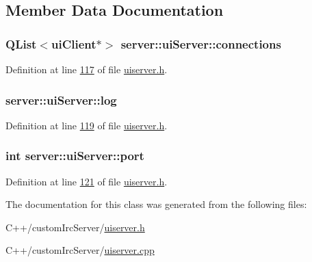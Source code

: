 \subsection{Member Data Documentation}
\hypertarget{classserver_1_1ui_server_a8e2c0099cfa061c41eb45bb050f55321}{
\subsubsection[{connections}]{\setlength{\rightskip}{0pt plus 5cm}Q\-List$<${\bf ui\-Client}$\ast$$>$ server\-::ui\-Server\-::connections\hspace{0.3cm}{\ttfamily [private]}}}\label{df/dd2/classserver_1_1ui_server_a8e2c0099cfa061c41eb45bb050f55321}


Definition at line \hyperlink{uiserver_8h_source_l00117}{117} of file \hyperlink{uiserver_8h_source}{uiserver.\-h}.

\hypertarget{classserver_1_1ui_server_a0c287bc3691a6aabe181158cf1176632}{
\subsubsection[{log}]{ server\-::ui\-Server\-::log\hspace{0.3cm}{\ttfamily [private]}}}\label{df/dd2/classserver_1_1ui_server_a0c287bc3691a6aabe181158cf1176632}


Definition at line \hyperlink{uiserver_8h_source_l00119}{119} of file \hyperlink{uiserver_8h_source}{uiserver.\-h}.

\hypertarget{classserver_1_1ui_server_a960211cb9716f5d3b403d10ccface8b8}{
\subsubsection[{port}]{\setlength{\rightskip}{0pt plus 5cm}int server\-::ui\-Server\-::port\hspace{0.3cm}{\ttfamily [private]}}}\label{df/dd2/classserver_1_1ui_server_a960211cb9716f5d3b403d10ccface8b8}


Definition at line \hyperlink{uiserver_8h_source_l00121}{121} of file \hyperlink{uiserver_8h_source}{uiserver.\-h}.



The documentation for this class was generated from the following files\-:\begin{DoxyCompactItemize}
\item 
C++/custom\-Irc\-Server/\hyperlink{uiserver_8h}{uiserver.\-h}\item 
C++/custom\-Irc\-Server/\hyperlink{uiserver_8cpp}{uiserver.\-cpp}\end{DoxyCompactItemize}

